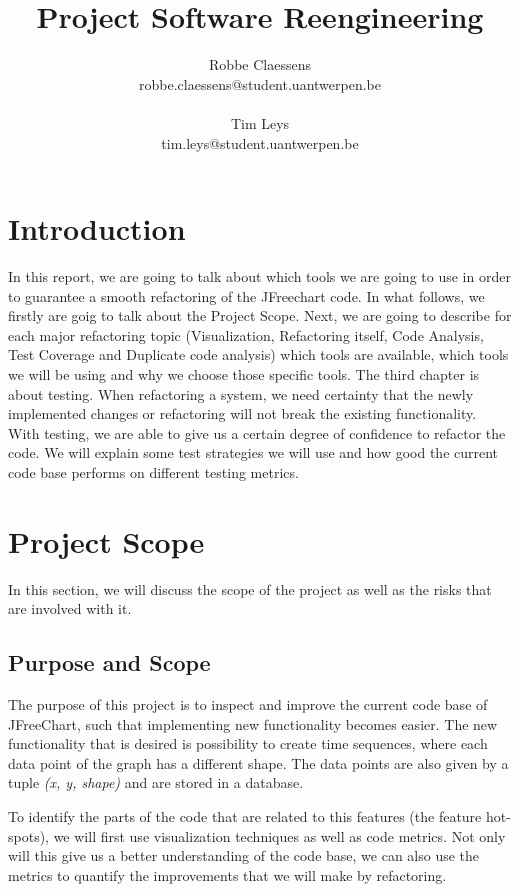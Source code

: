 \documentclass[]{article}
\title{Project Software Reengineering}
\author{Robbe Claessens \\ robbe.claessens@student.uantwerpen.be \\ \\Tim Leys\\tim.leys@student.uantwerpen.be}
\begin{document}
\maketitle



\section{Introduction}
In this report, we are going to talk about which tools we are going to use in order to guarantee a smooth refactoring of the JFreechart code. In what follows, we firstly are goig to talk about the Project Scope. Next, we are going to describe for each major refactoring topic (Visualization, Refactoring itself, Code Analysis, Test Coverage and Duplicate code analysis) which tools are available, which tools we will be using and why we choose those specific tools. The third chapter is about testing. When refactoring a system, we need certainty that the newly implemented changes or refactoring will not break the existing functionality. With testing, we are able to give us a certain degree of confidence to refactor the code. We will explain some test strategies we will use and how good the current code base performs on different testing metrics.

\section{Project Scope}

In this section, we will discuss the scope of the project as well as the risks that are involved with it.

\subsection{Purpose and Scope}
The purpose of this project is to inspect and improve the current code base of JFreeChart, such that implementing new functionality becomes easier. The new functionality that is desired is possibility to create time sequences, where each data point of the graph has a different shape. The data points are also given by a tuple \textit{(x, y, shape)} and are stored in a database.  

To identify the parts of the code that are related to this features (the feature hot-spots), we will first use visualization techniques as well as code metrics. Not only will this give us a better understanding of the code base, we can also use the metrics to quantify the improvements that we will make by refactoring.
\end{document}

